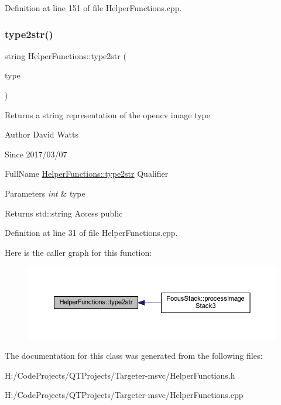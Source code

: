 Definition at line 151 of file Helper\+Functions.\+cpp.

\mbox{\label{class_helper_functions_a0b9d882eaf6b7d85aad907ee3e94d197}} 
\subsubsection{\texorpdfstring{type2str()}{type2str()}}
{\footnotesize\ttfamily string Helper\+Functions\+::type2str (\begin{DoxyParamCaption}\item[{int}]{type }\end{DoxyParamCaption})\hspace{0.3cm}{\ttfamily [static]}}

Returns a string representation of the opencv image type

\begin{DoxyAuthor}{Author}
David Watts 
\end{DoxyAuthor}
\begin{DoxySince}{Since}
2017/03/07
\end{DoxySince}
Full\+Name \hyperlink{class_helper_functions_a0b9d882eaf6b7d85aad907ee3e94d197}{Helper\+Functions\+::type2str} Qualifier 
\begin{DoxyParams}{Parameters}
{\em int} & type \\
\hline
\end{DoxyParams}
\begin{DoxyReturn}{Returns}
std\+::string Access public 
\end{DoxyReturn}


Definition at line 31 of file Helper\+Functions.\+cpp.

Here is the caller graph for this function\+:
\nopagebreak
\begin{figure}[H]
\begin{center}
\leavevmode
\includegraphics[width=350pt]{class_helper_functions_a0b9d882eaf6b7d85aad907ee3e94d197_icgraph}
\end{center}
\end{figure}


The documentation for this class was generated from the following files\+:\begin{DoxyCompactItemize}
\item 
H\+:/\+Code\+Projects/\+Q\+T\+Projects/\+Targeter-\/msvc/Helper\+Functions.\+h\item 
H\+:/\+Code\+Projects/\+Q\+T\+Projects/\+Targeter-\/msvc/Helper\+Functions.\+cpp\end{DoxyCompactItemize}
